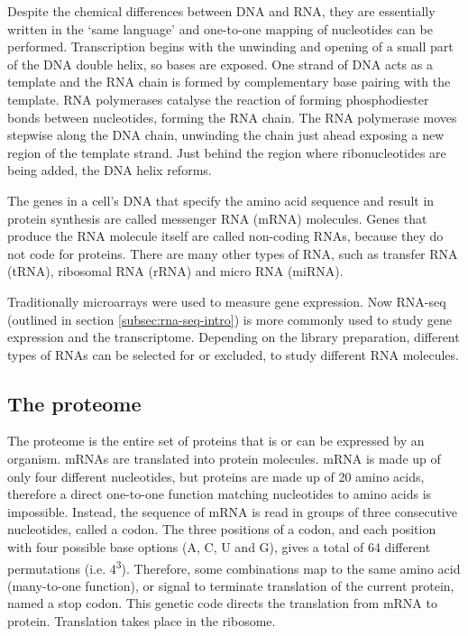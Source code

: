 Despite the chemical differences between DNA and RNA, they are essentially written in the `same language' and one-to-one mapping of nucleotides can be performed.
Transcription begins with the unwinding and opening of a small part of the DNA double helix, so bases are exposed.
One strand of DNA acts as a template and the RNA chain is formed by complementary base pairing with the template.
RNA polymerases catalyse the reaction of forming phosphodiester bonds between nucleotides, forming the RNA chain.
The RNA polymerase moves stepwise along the DNA chain, unwinding the chain just ahead exposing a new region of the template strand.
Just behind the region where ribonucleotides are being added, the DNA helix reforms.

The genes in a cell's DNA that specify the amino acid sequence and result in protein synthesis are called messenger RNA (mRNA) molecules.
Genes that produce the RNA molecule itself are called non-coding RNAs, because they do not code for proteins.
There are many other types of RNA, such as transfer RNA (tRNA), ribosomal RNA (rRNA) and micro RNA (miRNA).

Traditionally microarrays were used to measure gene expression.
Now RNA-seq (outlined in section  \ref{subsec:rna-seq-intro}) is more commonly used to study gene expression and the transcriptome.
Depending on the library preparation, different types of RNAs can be selected for or excluded, to study different RNA molecules.

\subsection{The proteome}\label{subsec:translation}
The proteome is the entire set of proteins that is or can be expressed by an organism.
mRNAs are translated into protein molecules.
mRNA is made up of only four different nucleotides, but proteins are made up of 20 amino acids, therefore a direct one-to-one function matching nucleotides to amino acids is impossible.
Instead, the sequence of mRNA is read in groups of three consecutive nucleotides, called a codon.
The three positions of a codon, and each position with four possible base options (A, C, U and G), gives a total of 64 different permutations (i.e. 4\textsuperscript{3}).
Therefore, some combinations map to the same amino acid (many-to-one function), or signal to terminate translation of the current protein, named a stop codon.
This genetic code directs the translation from mRNA to protein.
Translation takes place in the ribosome.

